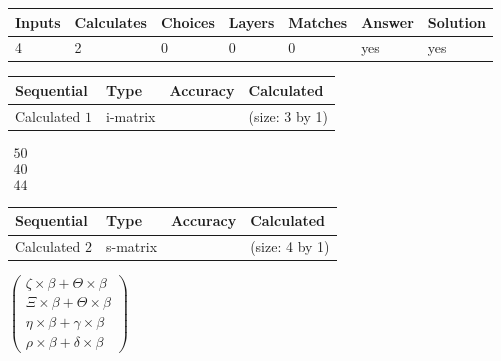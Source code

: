 \documentclass[12pt]{article}
\begin{document}
 
\noindent{}
 
 

 
 
\noindent{}
 
 

 
\vspace{0.3in}
   
   
   
   
\noindent\begin{tabular}{|l|l|l|l|l|l|l|}
 \hline
Inputs & Calculates & Choices & Layers & Matches & Answer & Solution \\ \hline
           4 & 
           2 & 
           0
  & 
           0 & 
           0 & 
  yes & 
  yes 
  \\ \hline
 \end{tabular}
   
   
   
   
\noindent{}
   
   
  
  
\noindent\begin{tabular}{|l|l|l|l|}
\hline
 Sequential & Type & Accuracy & Calculated \\ 
\hline
 
 
  Calculated $           1$ & i-matrix &  & 
 (size:           3 by           1)
 \\  \hline  
 \end{tabular}
   
   
$\begin{array}{
 c
 }
          50 \\ 
          40 \\ 
          44
 \end{array}  $ 
  
  
\noindent\begin{tabular}{|l|l|l|l|}
\hline
 Sequential & Type & Accuracy & Calculated \\ 
\hline
 
 
  Calculated $           2$ & s-matrix & & 
 (size:           4 by           1)
 \\  \hline  
 \end{tabular}
   
   
 $   \left( \begin{array}
 {
 c
 }
                    \zeta \times  \beta   +  \Theta \times  \beta \\ 
                    \Xi \times  \beta   +  \Theta \times  \beta \\ 
 \eta \times  \beta   +  \gamma \times  \beta \\ 
 \rho \times  \beta   +  \delta \times  \beta
 \end{array} \right) $ 
   
\end{document}
